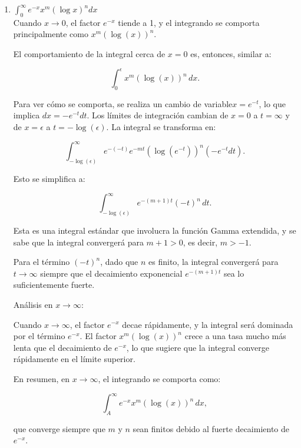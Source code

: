 \documentclass{article}
\begin{document}
\begin{enumerate}
\begin{enumerate}
\[
\int_0^\infty t^n e^{-t} \, dt.
\]

Esta es la forma estándar de la función Gamma $\Gamma(n+1)$, que converge para $n > -1$.
Entonces, la integral converge si $n > -1$. Si $n \leq -1$, la integral diverge debido a que $(\log(x))^n$ se vuelve demasiado grande cuando $x \to 0^+$.

		\item $ \int_{0}^{\infty} e^{-x}x^m(\log x)^n dx $
\[\]        
Cuando \( x \to 0 \), el factor \( e^{-x} \) tiende a 1, y el integrando se comporta principalmente como \( x^m (\log(x))^n \).

El comportamiento de la integral cerca de \( x = 0 \) es, entonces, similar a:

\[
\int_0^\epsilon x^m (\log(x))^n \, dx.
\]

Para ver cómo se comporta, se realiza un cambio de variable\( x = e^{-t} \), lo que implica \( dx = -e^{-t} dt \). Los límites de integración cambian de \( x = 0 \) a \( t = \infty \) y de \( x = \epsilon \) a \( t = -\log(\epsilon) \). La integral se transforma en:

\[
\int_{-\log(\epsilon)}^\infty e^{-(-t)} e^{-mt} (\log(e^{-t}))^n (-e^{-t} dt).
\]

Esto se simplifica a:

\[
\int_{-\log(\epsilon)}^\infty e^{-(m+1)t} (-t)^n \, dt.
\]

Esta es una integral estándar que involucra la función Gamma extendida, y se sabe que la integral convergerá para \( m+1 > 0 \), es decir, \( m > -1 \).

Para el término \( (-t)^n \), dado que \( n \) es finito, la integral convergerá para \( t \to \infty \) siempre que el decaimiento exponencial \( e^{-(m+1)t} \) sea lo suficientemente fuerte.

Análisis en \( x \to \infty \):

Cuando \( x \to \infty \), el factor \( e^{-x} \) decae rápidamente, y la integral será dominada por el término \( e^{-x} \). El factor \( x^m (\log(x))^n \) crece a una tasa mucho más lenta que el decaimiento de \( e^{-x} \), lo que sugiere que la integral converge rápidamente en el límite superior.

En resumen, en \( x \to \infty \), el integrando se comporta como:

\[
\int_A^\infty e^{-x} x^m (\log(x))^n \, dx,
\]

que converge siempre que \( m \) y \( n \) sean finitos debido al fuerte decaimiento de \( e^{-x} \).


\end{enumerate}
\end{enumerate}
\end{document}
